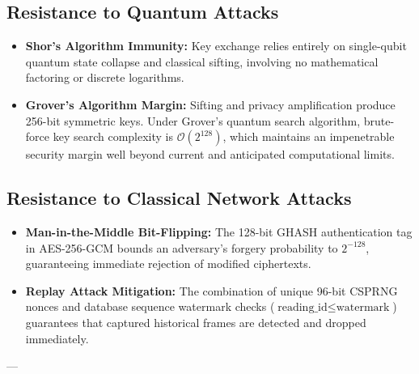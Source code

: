 \documentclass[journal,10pt,twocolumn]{article}
\begin{document}
\subsection{Resistance to Quantum Attacks}
\begin{itemize}
    \item \textbf{Shor's Algorithm Immunity:} Key exchange relies entirely on single-qubit quantum state collapse and classical sifting, involving no mathematical factoring or discrete logarithms.
    \item \textbf{Grover's Algorithm Margin:} Sifting and privacy amplification produce 256-bit symmetric keys. Under Grover's quantum search algorithm, brute-force key search complexity is $\mathcal{O}(2^{128})$, which maintains an impenetrable security margin well beyond current and anticipated computational limits.
\end{itemize}

\subsection{Resistance to Classical Network Attacks}
\begin{itemize}
    \item \textbf{Man-in-the-Middle Bit-Flipping:} The 128-bit GHASH authentication tag in AES-256-GCM bounds an adversary's forgery probability to $2^{-128}$, guaranteeing immediate rejection of modified ciphertexts.
    \item \textbf{Replay Attack Mitigation:} The combination of unique 96-bit CSPRNG nonces and database sequence watermark checks ($\text{reading\_id} \le \text{watermark}$) guarantees that captured historical frames are detected and dropped immediately.
\end{itemize}

---
\end{document}
